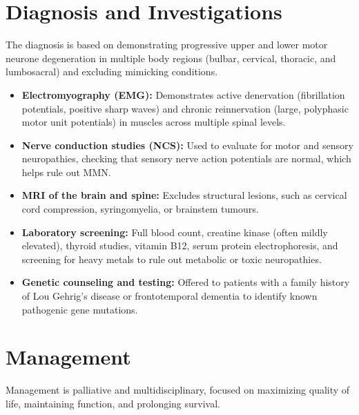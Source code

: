 \section*{Diagnosis and Investigations}
The diagnosis is based on demonstrating progressive upper and lower motor neurone degeneration in multiple body regions (bulbar, cervical, thoracic, and lumbosacral) and excluding mimicking conditions.

\begin{itemize}
    \item \textbf{Electromyography (EMG):} Demonstrates active denervation (fibrillation potentials, positive sharp waves) and chronic reinnervation (large, polyphasic motor unit potentials) in muscles across multiple spinal levels.
    \item \textbf{Nerve conduction studies (NCS):} Used to evaluate for motor and sensory neuropathies, checking that sensory nerve action potentials are normal, which helps rule out MMN.
    \item \textbf{MRI of the brain and spine:} Excludes structural lesions, such as cervical cord compression, syringomyelia, or brainstem tumours.
    \item \textbf{Laboratory screening:} Full blood count, creatine kinase (often mildly elevated), thyroid studies, vitamin B12, serum protein electrophoresis, and screening for heavy metals to rule out metabolic or toxic neuropathies.
    \item \textbf{Genetic counseling and testing:} Offered to patients with a family history of Lou Gehrig's disease or frontotemporal dementia to identify known pathogenic gene mutations.
\end{itemize}

\section*{Management}
Management is palliative and multidisciplinary, focused on maximizing quality of life, maintaining function, and prolonging survival.

